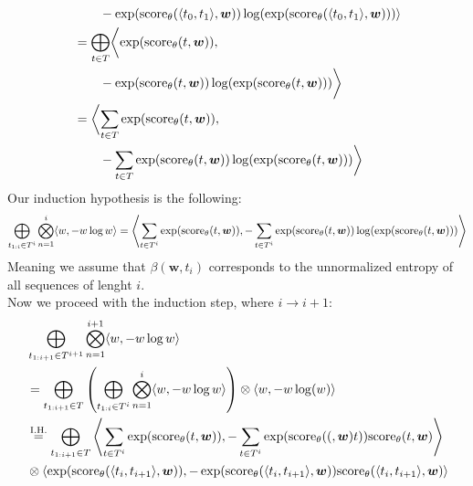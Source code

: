\documentclass[a4paper,12pt]{ETHexercise}
\begin{document}
\begin{question}
\begin{subquestion}
\begin{align}
			                                                                                       & \qquad -\exp(\text{score}_{\theta}(\langle t_0, t_1 \rangle, \boldsymbol{w})) \log(\exp(\text{score}_{\theta}(\langle t_0, t_1 \rangle, \boldsymbol{w}))) \rangle               \\
			                                                                                       & = \bigoplus_{t \in T} \biggl< \exp(\text{score}_{\theta}(t, \boldsymbol{w})),                         \nonumber \\
			                                                                                       & \qquad  -\exp(\text{score}_{\theta}(t, \boldsymbol{w})) \log(\exp(\text{score}_{\theta}(t, \boldsymbol{w}))) \biggr>                          \\
			                                                                                       & = \biggl< \sum_{t \in T} \exp(\text{score}_{\theta}(t, \boldsymbol{w})),                              \nonumber \\
			                                                                                       & \qquad -\sum_{t \in T} \exp(\text{score}_{\theta}(t, \boldsymbol{w})) \log(\exp(\text{score}_{\theta}(t, \boldsymbol{w}))) \biggr>
		\end{align}
		Our induction hypothesis is the following:\\
		\begin{align}
			\bigoplus_{t_{1:i} \in T^{i}} \overset{i}{\bigotimes_{n=1}} \langle w, -w \log w \rangle = \left\langle \sum_{t \in T^{i}} \exp(\text{score}_{\theta}(t, \boldsymbol{w})), -\sum_{t \in T^{i}} \exp(\text{score}_{\theta}(t, \boldsymbol{w})) \log(\exp(\text{score}_{\theta}(t, \boldsymbol{w}))) \right\rangle
		\end{align}
		Meaning we assume that $\beta(\mathbf{w}, t_i)$ corresponds to the unnormalized entropy of all sequences of lenght $i$.\\
		Now we proceed with the induction step, where $i \rightarrow i + 1$:\\
		\begin{align}
			 & \bigoplus_{t_{1:i+1} \in T^{i+1}} \overset{i+1}{\bigotimes_{n=1}} \langle w, -w \log w \rangle \nonumber                                                                       \\ & = \bigoplus_{t_{1:i+1} \in T}  \left( \bigoplus_{t_{1:i} \in T^{i}} \overset{i}{\bigotimes_{n=1}} \langle w, -w \log w \rangle \right) \otimes \langle w, -w \log(w) \rangle \\
			 & \overset{\text{I.H.}}{=} \bigoplus_{t_{1:i+1} \in T} \left\langle \sum_{t \in T^{i}} \exp(\sscore{t}), -\sum_{t \in T^{i}} \exp(\sscore(t)) \sscore{t} \right\rangle \nonumber \\
			 & \otimes \left\langle \exp(\score{t_i}{t_{i+1}}), -\exp(\score{t_i}{t_{i+1}}) \score{t_i}{t_{i+1}}\right\rangle \label{eq:after_ih}

\end{align}
\end{subquestion}
\end{question}
\end{document}
